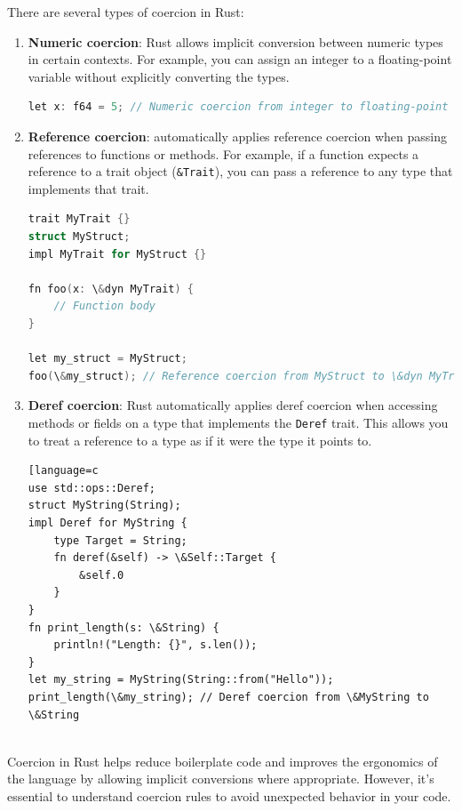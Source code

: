 \documentclass{article}
\begin{document}
There are several types of coercion in Rust:

\begin{enumerate}
    \item \textbf{Numeric coercion}: Rust allows implicit conversion between numeric types in certain contexts. For example, you can assign an integer to a floating-point variable without explicitly converting the types.
    \begin{lstlisting}[language=c]
let x: f64 = 5; // Numeric coercion from integer to floating-point
    \end{lstlisting}

    \item \textbf{Reference coercion}: automatically applies reference coercion when passing references to functions or methods. For example, if a function expects a reference to a trait object (\texttt{\&Trait}), you can pass a reference to any type that implements that trait.
    \begin{lstlisting}[language=c]
trait MyTrait {}
struct MyStruct;
impl MyTrait for MyStruct {}

fn foo(x: \&dyn MyTrait) {
    // Function body
}

let my_struct = MyStruct;
foo(\&my_struct); // Reference coercion from MyStruct to \&dyn MyTrait
    \end{lstlisting}

    \item \textbf{Deref coercion}: Rust automatically applies deref coercion when accessing methods or fields on a type that implements the \texttt{Deref} trait. This allows you to treat a reference to a type as if it were the type it points to.
    \begin{lstlisting}[language=c
use std::ops::Deref;
struct MyString(String);
impl Deref for MyString {
    type Target = String;
    fn deref(&self) -> \&Self::Target {
        &self.0
    }
}
fn print_length(s: \&String) {
    println!("Length: {}", s.len());
}
let my_string = MyString(String::from("Hello"));
print_length(\&my_string); // Deref coercion from \&MyString to \&String
    \end{lstlisting}
\end{enumerate}
\\
Coercion in Rust helps reduce boilerplate code and improves the ergonomics of the language by allowing implicit conversions where appropriate. However, it's essential to understand coercion rules to avoid unexpected behavior in your code.
\end{document}
